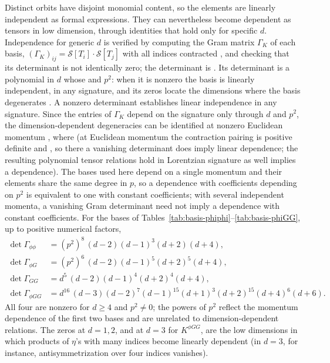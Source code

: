 \documentclass[prd,aps,preprint,superscriptaddress,nofootinbib,amsmath,amssymb,eqsecnum]{revtex4-2}
\providecommand{\DIFaddtex}[1]{{\protect\color{blue} \sf #1}} %
\providecommand{\DIFdeltex}[1]{{\protect\color{red} \scriptsize #1}} %
\providecommand{\DIFaddbegin}{} %
\providecommand{\DIFaddend}{} %
\providecommand{\DIFdelbegin}{} %
\providecommand{\DIFdelend}{} %
\providecommand{\DIFadd}[1]{\texorpdfstring{\DIFaddtex{#1}}{#1}} %
\providecommand{\DIFdel}[1]{\texorpdfstring{\DIFdeltex{#1}}{}} %
\begin{document}
Distinct orbits have disjoint monomial content, so the elements are linearly independent as
formal expressions. They can nevertheless become dependent as tensors in low dimension,
through identities that hold only for specific $d$. Independence for generic $d$ is verified by
computing the Gram matrix $\Gamma_K$ of each basis, $(\Gamma_K)_{ij}=\mathcal{S}[T_i]\cdot\mathcal{S}[T_j]$
with all indices contracted\DIFdelbegin \DIFdel{, and checking that its determinant is not identically zero; the
determinant is }\DIFdelend \DIFaddbegin \DIFadd{. Its determinant is }\DIFaddend a polynomial in $d$ \DIFdelbegin \DIFdel{whose }\DIFdelend \DIFaddbegin \DIFadd{and $p^2$: when it is
nonzero the basis is linearly independent, in any signature, and its }\DIFaddend zeros locate the
dimensions where the basis degenerates \DIFdelbegin \DIFdel{. A nonzero determinant establishes linear independence in any signature. Since
the entries of $\Gamma_K$ depend on the signature only through $d$ and $p^2$, the
dimension-dependent degeneracies can be identified at nonzero Euclidean momentum , where }\DIFdelend \DIFaddbegin \DIFadd{(at Euclidean momentum }\DIFaddend the contraction pairing is
positive definite\DIFdelbegin \DIFdel{and }\DIFdelend \DIFaddbegin \DIFadd{, so there }\DIFaddend a vanishing determinant \DIFdelbegin \DIFdel{does imply linear
dependence; the resulting polynomial tensor relations hold in Lorentzian signature as well}\DIFdelend \DIFaddbegin \DIFadd{implies a dependence). The bases used
here depend on a single momentum and their elements share the same degree in $p$, so a
dependence with coefficients depending on $p^2$ is equivalent to one with constant
coefficients; with several independent momenta, a vanishing Gram determinant need not imply
a dependence with constant coefficients}\DIFaddend . For the bases of Tables~\ref{tab:basis-phiphi}--\ref{tab:basis-phiGG}, up to
positive numerical factors,
\begin{align}
\det\Gamma_{\phi\phi}&=(p^2)^8\,(d-2)(d-1)^3(d+2)(d+4),\\
\det\Gamma_{\phi G}&=(p^2)^6\,(d-2)(d-1)^5(d+2)^5(d+4),\\
\det\Gamma_{GG}&=d^5\,(d-2)(d-1)^4(d+2)^4(d+4),\\
\det\Gamma_{\phi GG}&=d^{16}\,(d-3)(d-2)^7(d-1)^{15}(d+1)^3(d+2)^{15}(d+4)^6(d+6).
\end{align}
All four are nonzero for $d\geq4$ and $p^2\neq0$; the powers of $p^2$ reflect the momentum
dependence of the first two bases and are unrelated to dimension-dependent relations. The
zeros at $d=1,2$, and at $d=3$ for $K^{\phi GG}$,
are the low dimensions in which products of $\eta$'s with many indices become linearly
dependent (in $d=3$, for instance, antisymmetrization over four indices vanishes).
\end{document}
